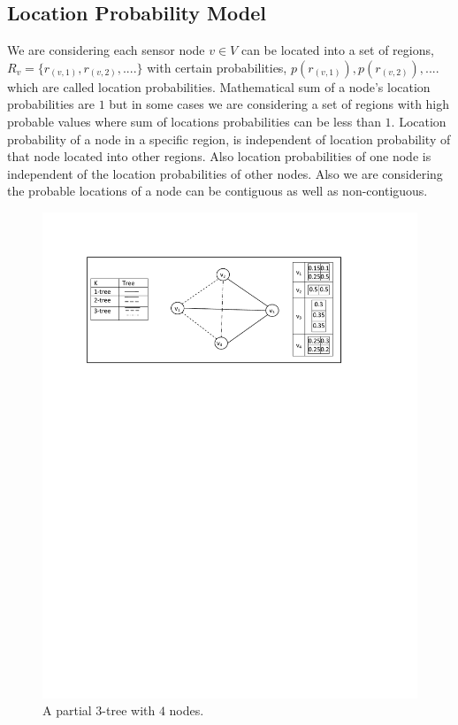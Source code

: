 \documentclass[12pt]{article}
\begin{document}
\subsection{Location Probability Model}
\label{subsec:LPM}
We are considering each sensor node $v\in V$ can be located into a set of regions, $R_v=\{r_{(v,1)},r_{(v,2)},....\}$ with certain probabilities, $p(r_{(v,1)}),p(r_{(v,2)}),....$ which are called location probabilities. Mathematical sum of a node's  location probabilities are $1$ but in some cases we are considering a set of regions with high probable values where sum of locations probabilities can be less than $1$. Location probability of a node in a specific region, is independent of location probability of that node located into other regions. Also location probabilities of one node is independent of the location probabilities of other nodes. Also we are considering the probable locations of a node can be contiguous as well as non-contiguous.\\

\begin{figure}[h]
\centering
\includegraphics[width=6 in, height=2.5 in]{First_Example.pdf}
 \caption{A partial \(3\)-tree with \(4\) nodes.
}
\end{figure}
 
\end{document}
